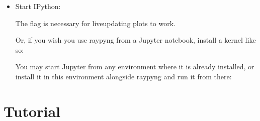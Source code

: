 \documentclass[letterpaper,10pt,english]{sphinxmanual}
\begin{document}
\begin{itemize}
\begin{sphinxVerbatim}[commandchars=\\\{\}]
python3 \PYGZhy{}m pip install \PYGZhy{}\PYGZhy{}upgrade raypyng\PYGZhy{}bluesky ipython
\end{sphinxVerbatim}

\item {} 
\sphinxAtStartPar
Start IPython:

\begin{sphinxVerbatim}[commandchars=\\\{\}]
 
\end{sphinxVerbatim}

\sphinxAtStartPar
The flag  is necessary for live\sphinxhyphen{}updating plots to work.

\sphinxAtStartPar
Or, if you wish you use raypyng from a Jupyter notebook, install a kernel like
so:

\begin{sphinxVerbatim}[commandchars=\\\{\}]
      
\end{sphinxVerbatim}

\sphinxAtStartPar
You may start Jupyter from any environment where it is already installed, or
install it in this environment alongside raypyng and run it from there:

\begin{sphinxVerbatim}[commandchars=\\\{\}]
  
 
\end{sphinxVerbatim}

\end{itemize}

\sphinxstepscope


\chapter{Tutorial}
\label{\detokenize{tutorial:tutorial}}\label{\detokenize{tutorial::doc}}
\end{document}
